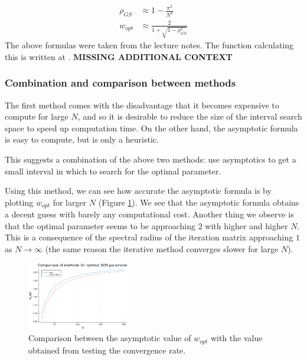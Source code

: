 \documentclass{article}
\numberwithin{equation}{section}
\theoremstyle{definition}
\begin{document}
\begin{align}
    \rho_{GS} &\approx 1 - \frac{\pi^2}{N^2} \\
    w_{opt} &\approx \frac{2}{1 + \sqrt{1-\rho_{GS}^2}}
\end{align}
The above formulas were taken from the lecture notes. The function calculating this is written at . \textbf{MISSING ADDITIONAL CONTEXT}


\subsubsection{Combination and comparison between methods}
The first method comes with the disadvantage that it becomes expensive to compute for large $N$, and so it is desirable to reduce the size of the interval search space to speed up computation time. On the other hand, the asymptotic formula is easy to compute, but is only a heuristic.

This suggests a combination of the above two methods: use asymptotics to get a small interval in which to search for the optimal parameter.

Using this method, we can see how accurate the asymptotic formula is by plotting $w_{opt}$ for larger $N$ (Figure \ref{fig:figsor2}). We see that the asymptotic formula obtains a decent guess with barely any computational cost. Another thing we observe is that the optimal parameter seems to be approaching $2$ with higher and higher $N$. This is a consequence of the spectral radius of the iteration matrix approaching $1$ as $N \to \infty$ (the same reason the iterative method converges slower for large $N$).

\begin{figure}[H]
    \centering
    \includegraphics[width=0.4\textwidth]{figsor2.png}
    \caption{Comparison between the asymptotic value of $w_{opt}$ with the value obtained from testing the convergence rate.}
    \label{fig:figsor2}
\end{figure}
\end{document}
